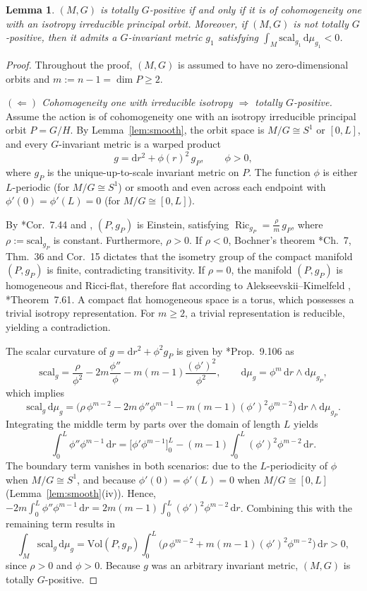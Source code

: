 \documentclass[12pt,a4paper]{amsart}
\theoremstyle{plain}
\newtheorem{lemma}[theorem]{Lemma}
\theoremstyle{definition}
\theoremstyle{remark}
\DeclareMathOperator{\Ricci}{Ric}
\newcommand{\ga}{\mathit{g}} %
\begin{document}
\begin{lemma}\label{lem:dichotomy}
$(M, G)$ is totally $G$-positive if and only if it is of cohomogeneity one with an isotropy irreducible principal orbit. Moreover, if $(M,G)$ is not totally $G$-positive, then it admits a $G$-invariant metric $\ga_1$ satisfying $\int_M\mathrm{scal}_{\ga_1}\,\mathrm{d}\mu_{\ga_1}<0$.
\end{lemma}
\begin{proof}
Throughout the proof, $(M,G)$ is assumed to have no zero-dimensional orbits and $m := n-1 = \dim P \ge 2$.

\smallskip
\noindent\emph{$(\Leftarrow)$ Cohomogeneity one with irreducible isotropy $\Rightarrow$ totally $G$-positive.} 
Assume the action is of cohomogeneity one with an isotropy irreducible principal orbit $P=G/H$. By Lemma~\ref{lem:smooth}, the orbit space is $M/G \cong S^1$ or $[0,L]$, and every $G$-invariant metric is a warped product
$$\ga=\mathrm{d}r^2+\phi(r)^2\,\ga_P,\qquad \phi>0,$$
where $\ga_P$ is the unique-up-to-scale invariant metric on $P$. The function $\phi$ is either $L$-periodic (for $M/G\cong S^1$) or smooth and even across each endpoint with $\phi'(0)=\phi'(L)=0$ (for $M/G\cong[0,L]$).

By \cite{besse1987einstein}*{Cor.~7.44} and \cite{Wolf1968}, $(P,\ga_P)$ is Einstein, satisfying $\Ricci_{\ga_P}=\tfrac{\rho}{m}\,\ga_P$, where $\rho := \mathrm{scal}_{\ga_P}$ is constant. Furthermore, $\rho > 0$. If $\rho < 0$, Bochner's theorem \cite{Petersen}*{Ch.~7, Thm.~36 and Cor.~15} dictates that the isometry group of the compact manifold $(P,\ga_P)$ is finite, contradicting transitivity. If $\rho = 0$, the manifold $(P,\ga_P)$ is homogeneous and Ricci-flat, therefore flat according to Alekseevskii--Kimelfeld \cite{Alekseevskii1975}, \cite{besse1987einstein}*{Theorem~7.61}. A compact flat homogeneous space is a torus, which possesses a trivial isotropy representation. For $m \ge 2$, a trivial representation is reducible, yielding a contradiction.

The scalar curvature of $\ga=\mathrm{d}r^2+\phi^2\ga_P$ is given by \cite{besse1987einstein}*{Prop.~9.106} as
$$\mathrm{scal}_\ga=\frac{\rho}{\phi^2}-2m\frac{\phi''}{\phi}-m(m-1)\frac{(\phi')^2}{\phi^2}, \qquad \mathrm{d}\mu_\ga=\phi^{m}\,\mathrm{d}r \wedge \mathrm{d}\mu_{\ga_P},$$
which implies
$$\mathrm{scal}_\ga\,\mathrm{d}\mu_\ga=\bigl(\rho\,\phi^{m-2}-2m\,\phi''\phi^{m-1}-m(m-1)(\phi')^2\phi^{m-2}\bigr)\,\mathrm{d}r \wedge \mathrm{d}\mu_{\ga_P}.$$
Integrating the middle term by parts over the domain of length $L$ yields
$$\int_0^L\phi''\phi^{m-1}\,\mathrm{d}r=\bigl[\phi'\phi^{m-1}\bigr]_0^L-(m-1)\int_0^L(\phi')^2\phi^{m-2}\,\mathrm{d}r.$$
The boundary term vanishes in both scenarios: due to the $L$-periodicity of $\phi$ when $M/G\cong S^1$, and because $\phi'(0)=\phi'(L)=0$ when $M/G\cong[0,L]$ (Lemma~\ref{lem:smooth}(iv)). Hence, $-2m\int_0^L\phi''\phi^{m-1}\,\mathrm{d}r = 2m(m-1)\int_0^L(\phi')^2\phi^{m-2}\,\mathrm{d}r$. Combining this with the remaining term results in
$$\int_M\mathrm{scal}_\ga\,\mathrm{d}\mu_\ga=\mathrm{Vol}(P,\ga_P)\int_0^L\bigl(\rho\,\phi^{m-2}+m(m-1)(\phi')^2\phi^{m-2}\bigr)\,\mathrm{d}r>0,$$
since $\rho>0$ and $\phi>0$. Because $\ga$ was an arbitrary invariant metric, $(M,G)$ is totally $G$-positive.


\end{proof}
\end{document}
